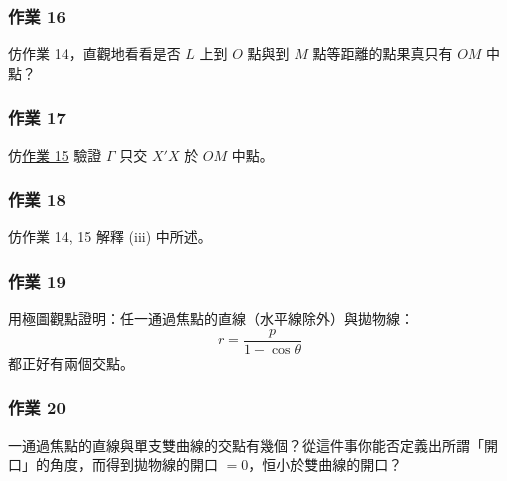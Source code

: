 \subsubsection*{作業 16}
仿作業 14，直觀地看看是否 $L$ 上到 $O$ 點與到 $M$ 點等距離的點果真只有 $OM$ 中點？

\subsubsection*{作業 17}
仿\underline{作業 15} 驗證 $\Gamma$ 只交 $X'X$ 於 $OM$ 中點。

\subsubsection*{作業 18}
仿作業 14, 15 解釋 (iii) 中所述。

\subsubsection*{作業 19}
用極圖觀點證明：任一通過焦點的直線（水平線除外）與拋物線：
\[
  r = \frac{p}{1 - \cos\theta}
\]
都正好有兩個交點。

\subsubsection*{作業 20}
一通過焦點的直線與單支雙曲線的交點有幾個？從這件事你能否定義出所謂「開口」的角度，而得到拋物線的開口 $= 0$，恒小於雙曲線的開口？


